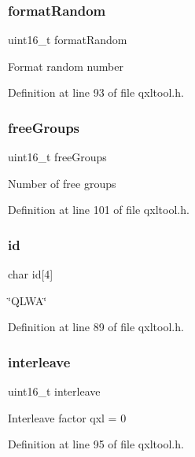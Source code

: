 \subsubsection{\texorpdfstring{format\+Random}{formatRandom}}
{\footnotesize\ttfamily uint16\+\_\+t format\+Random}

Format random number 

Definition at line 93 of file qxltool.\+h.

\mbox{\label{struct_h_e_a_d_e_r_ade875077d30252b3c29f1798215714b7}} 
\subsubsection{\texorpdfstring{free\+Groups}{freeGroups}}
{\footnotesize\ttfamily uint16\+\_\+t free\+Groups}

Number of free groups 

Definition at line 101 of file qxltool.\+h.

\mbox{\label{struct_h_e_a_d_e_r_ace593da5319500315498c8f845ee2368}} 
\subsubsection{\texorpdfstring{id}{id}}
{\footnotesize\ttfamily char id\mbox{[}4\mbox{]}}

\char`\"{}\+Q\+L\+W\+A\char`\"{} 

Definition at line 89 of file qxltool.\+h.

\mbox{\label{struct_h_e_a_d_e_r_abd3763b764e7f73b3ce499116279e377}} 
\subsubsection{\texorpdfstring{interleave}{interleave}}
{\footnotesize\ttfamily uint16\+\_\+t interleave}

Interleave factor qxl = 0 

Definition at line 95 of file qxltool.\+h.

\mbox{\label{struct_h_e_a_d_e_r_a29b7fd8fc79af9f8e87044e61338b35b}} 
